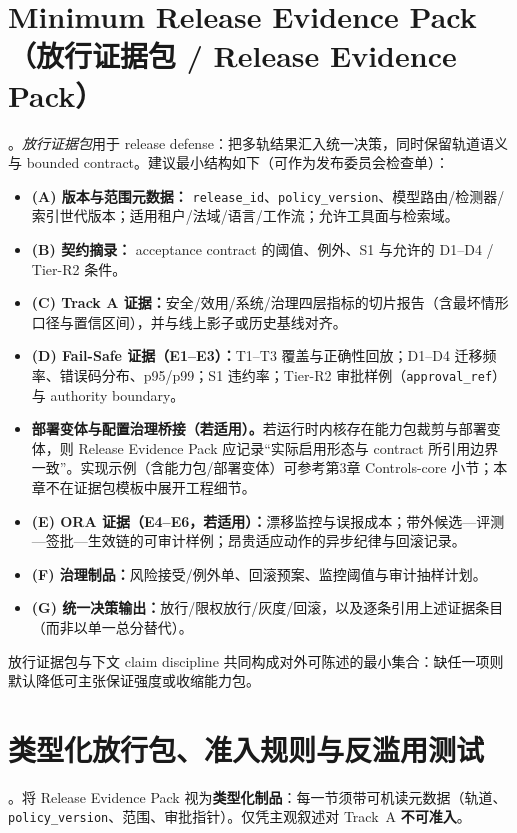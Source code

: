 \documentclass[11pt,a4paper]{report}
\begin{document}
\section{Minimum Release Evidence Pack（放行证据包 / Release Evidence Pack）}
\EvalFramework{}。\emph{放行证据包}用于 release defense：把多轨结果汇入统一决策，同时保留轨道语义与 bounded contract。建议最小结构如下（可作为发布委员会检查单）：
\begin{itemize}
  \item \textbf{(A) 版本与范围元数据：} \texttt{release\_id}、\texttt{policy\_version}、模型路由/检测器/索引世代版本；适用租户/法域/语言/工作流；允许工具面与检索域。
  \item \textbf{(B) 契约摘录：} acceptance contract 的阈值、例外、S1 与允许的 D1--D4 / Tier-R2 条件。
  \item \textbf{(C) Track A 证据：}安全/效用/系统/治理四层指标的切片报告（含最坏情形口径与置信区间），并与线上影子或历史基线对齐。
  \item \textbf{(D) Fail-Safe 证据（E1--E3）：}T1--T3 覆盖与正确性回放；D1--D4 迁移频率、错误码分布、p95/p99；S1 违约率；Tier-R2 审批样例（\texttt{approval\_ref}）与 authority boundary。
  \item[] \textbf{部署变体与配置治理桥接（若适用）。}若运行时内核存在能力包裁剪与部署变体，则 Release Evidence Pack 应记录“实际启用形态与 contract 所引用边界一致”。实现示例（含能力包/部署变体）可参考第3章 Controls-core 小节；本章不在证据包模板中展开工程细节。
  \item \textbf{(E) ORA 证据（E4--E6，若适用）：}漂移监控与误报成本；带外候选—评测—签批—生效链的可审计样例；昂贵适应动作的异步纪律与回滚记录。
  \item \textbf{(F) 治理制品：}风险接受/例外单、回滚预案、监控阈值与审计抽样计划。
  \item \textbf{(G) 统一决策输出：}放行/限权放行/灰度/回滚，以及逐条引用上述证据条目（而非以单一总分替代）。
\end{itemize}
\noindent 放行证据包与下文 claim discipline 共同构成对外可陈述的最小集合：缺任一项则默认降低可主张保证强度或收缩能力包。

\section{类型化放行包、准入规则与反滥用测试}
\EvalFramework{}。将 Release Evidence Pack 视为\textbf{类型化制品}：每一节须带可机读元数据（轨道、\texttt{policy\_version}、范围、审批指针）。仅凭主观叙述对 Track~A \textbf{不可准入}。
\end{document}
